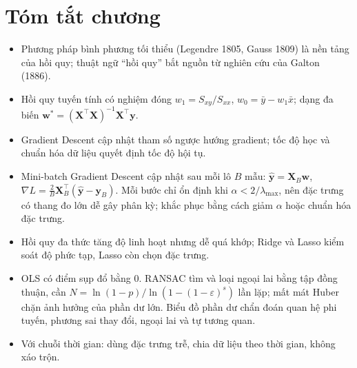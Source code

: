 \section{Tóm tắt chương}
\begin{itemize}
    \item Phương pháp bình phương tối thiểu (Legendre 1805, Gauss 1809) là nền tảng của hồi quy; thuật ngữ ``hồi quy'' bắt nguồn từ nghiên cứu của Galton (1886).
    \item Hồi quy tuyến tính có nghiệm đóng $w_1 = S_{xy}/S_{xx}$, $w_0 = \bar{y} - w_1\bar{x}$; dạng đa biến $\mathbf{w}^* = (\mathbf{X}^\top\mathbf{X})^{-1}\mathbf{X}^\top\mathbf{y}$.
    \item Gradient Descent cập nhật tham số ngược hướng gradient; tốc độ học và chuẩn hóa dữ liệu quyết định tốc độ hội tụ.
    \item Mini-batch Gradient Descent cập nhật sau mỗi lô $B$ mẫu: $\hat{\mathbf{y}} = \mathbf{X}_B\mathbf{w}$, $\nabla L = \frac{2}{B}\mathbf{X}_B^\top(\hat{\mathbf{y}} - \mathbf{y}_B)$. Mỗi bước chỉ ổn định khi $\alpha < 2/\lambda_{\max}$, nên đặc trưng có thang đo lớn dễ gây phân kỳ; khắc phục bằng cách giảm $\alpha$ hoặc chuẩn hóa đặc trưng.
    \item Hồi quy đa thức tăng độ linh hoạt nhưng dễ quá khớp; Ridge và Lasso kiểm soát độ phức tạp, Lasso còn chọn đặc trưng.
    \item OLS có điểm sụp đổ bằng 0. RANSAC tìm và loại ngoại lai bằng tập đồng thuận, cần $N = \ln(1 - p)/\ln(1 - (1 - \varepsilon)^s)$ lần lặp; mất mát Huber chặn ảnh hưởng của phần dư lớn. Biểu đồ phần dư chẩn đoán quan hệ phi tuyến, phương sai thay đổi, ngoại lai và tự tương quan.
    \item Với chuỗi thời gian: dùng đặc trưng trễ, chia dữ liệu theo thời gian, không xáo trộn.
\end{itemize}

